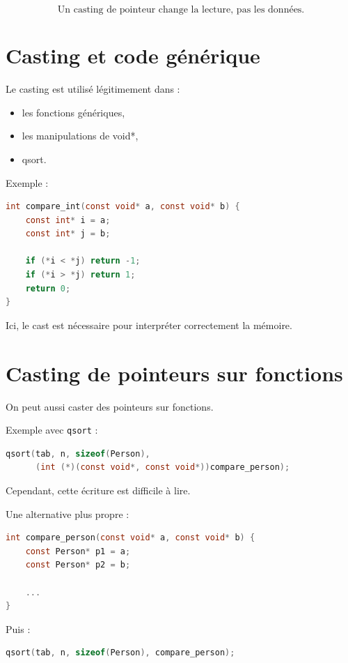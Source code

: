 \[
\boxed{
\text{Un casting de pointeur change la lecture, pas les données.}
}
\]

\section{Casting et code générique}

Le casting est utilisé légitimement dans :

\begin{itemize}
\item les fonctions génériques,
\item les manipulations de void*,
\item qsort.
\end{itemize}

Exemple :

\begin{lstlisting}[language=C]
int compare_int(const void* a, const void* b) {
    const int* i = a;
    const int* j = b;

    if (*i < *j) return -1;
    if (*i > *j) return 1;
    return 0;
}
\end{lstlisting}

Ici, le cast est nécessaire
pour interpréter correctement la mémoire.

\section{Casting de pointeurs sur fonctions}

On peut aussi caster des pointeurs sur fonctions.

Exemple avec \texttt{qsort} :

\begin{lstlisting}[language=C]
qsort(tab, n, sizeof(Person),
      (int (*)(const void*, const void*))compare_person);
\end{lstlisting}

Cependant, cette écriture est difficile à lire.

Une alternative plus propre :

\begin{lstlisting}[language=C]
int compare_person(const void* a, const void* b) {
    const Person* p1 = a;
    const Person* p2 = b;

    ...
}
\end{lstlisting}

Puis :

\begin{lstlisting}[language=C]
qsort(tab, n, sizeof(Person), compare_person);
\end{lstlisting}

